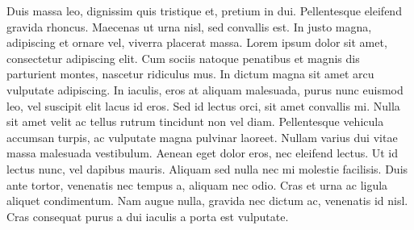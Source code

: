 \documentclass[a4paper,10pt]{letter}
\begin{document}
Duis massa leo, dignissim quis tristique et, pretium in dui. Pellentesque eleifend gravida rhoncus. Maecenas ut urna nisl, sed convallis est. In justo magna, adipiscing et ornare vel, viverra placerat massa. Lorem ipsum dolor sit amet, consectetur adipiscing elit. Cum sociis natoque penatibus et magnis dis parturient montes, nascetur ridiculus mus. In dictum magna sit amet arcu vulputate adipiscing. In iaculis, eros at aliquam malesuada, purus nunc euismod leo, vel suscipit elit lacus id eros. Sed id lectus orci, sit amet convallis mi. Nulla sit amet velit ac tellus rutrum tincidunt non vel diam. Pellentesque vehicula accumsan turpis, ac vulputate magna pulvinar laoreet. Nullam varius dui vitae massa malesuada vestibulum. Aenean eget dolor eros, nec eleifend lectus. Ut id lectus nunc, vel dapibus mauris. Aliquam sed nulla nec mi molestie facilisis. Duis ante tortor, venenatis nec tempus a, aliquam nec odio. Cras et urna ac ligula aliquet condimentum. Nam augue nulla, gravida nec dictum ac, venenatis id nisl. Cras consequat purus a dui iaculis a porta est vulputate.


\end{document}

